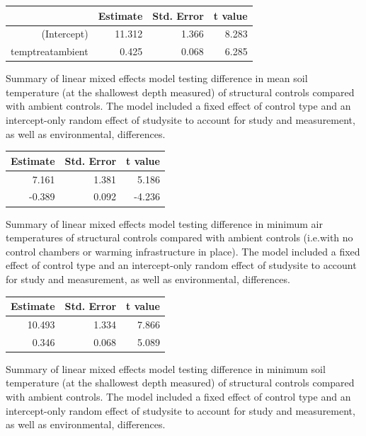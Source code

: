 \documentclass{article}
\begin{document}
\par
\begin{tabular}{rrrr}
  \hline
 & Estimate & Std. Error & t value \\ 
  \hline
(Intercept) & 11.312 & 1.366 & 8.283 \\ 
  temptreatambient & 0.425 & 0.068 & 6.285 \\ 
   \hline
\end{tabular}\par Summary of linear mixed effects model testing difference in mean soil temperature (at the shallowest depth measured) of structural controls compared with ambient controls. The model included a fixed effect of control type and an intercept-only random effect of studysite to account for study and measurement, as well as environmental, differences.
\par
\begin{tabular}{rrr}
  \hline
Estimate & Std. Error & t value \\ 
  \hline
7.161 & 1.381 & 5.186 \\ 
  -0.389 & 0.092 & -4.236 \\ 
   \hline
\end{tabular}\par Summary of linear mixed effects model testing difference in minimum air temperatures of structural controls compared with ambient controls (i.e.with no control chambers or warming infrastructure in place). The model included a fixed effect of control type and an intercept-only random effect of studysite to account for study and measurement, as well as environmental, differences.
\par
\begin{tabular}{rrr}
  \hline
Estimate & Std. Error & t value \\ 
  \hline
10.493 & 1.334 & 7.866 \\ 
  0.346 & 0.068 & 5.089 \\ 
   \hline
\end{tabular}\par Summary of linear mixed effects model testing difference in minimum soil temperature (at the shallowest depth measured) of structural controls compared with ambient controls. The model included a fixed effect of control type and an intercept-only random effect of studysite to account for study and measurement, as well as environmental, differences.
\end{document}
